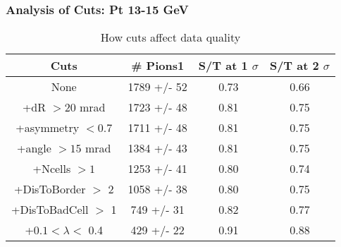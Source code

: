 \frame
{
\frametitle{Analysis of Cuts: Pt 13-15 GeV}
\begin{table}
\caption{How cuts affect data quality}
\centering
\begin{tabular}{c c c c}
\hline\hline
Cuts & \# Pions1 & S/T at 1 $\sigma$ & S/T at 2 $\sigma$ \\ [0.5ex]
\hline
None & 1789 +/-   52 & 0.73 & 0.66 \\ %
+dR $> 20$ mrad & 1723 +/-   48 & 0.81 & 0.75 \\ %
+asymmetry $< 0.7$ & 1711 +/-   48 & 0.81 & 0.75 \\ %
+angle $> 15$ mrad & 1384 +/-   43 & 0.81 & 0.75 \\ %
+Ncells $> 1$& 1253 +/-   41 & 0.80 & 0.74 \\ %
+DisToBorder $>$ 2 & 1058 +/-   38 & 0.80 & 0.75 \\ %
+DisToBadCell $>$ 1&  749 +/-   31 & 0.82 & 0.77 \\ %
+$0.1 < \lambda <$ 0.4 &  429 +/-   22 & 0.91 & 0.88 \\ %
[1ex]
\hline
\end{tabular}
\label{table:nonlin}
\end{table}
}

